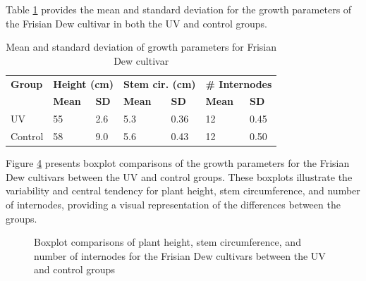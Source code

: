 Table \ref{tab:descriptive_statistics} provides the mean and standard deviation for the growth parameters of the Frisian Dew cultivar in both the UV and control groups.

\begin{table}[H]
    \caption[Mean and standard deviation of growth parameters]{Mean and standard deviation of growth parameters for Frisian Dew cultivar}
    \label{tab:descriptive_statistics}
    \begin{tabularx}{\linewidth}{l|XX|XX|XX}
        \toprule
        \textbf{Group} & \multicolumn{2}{l|}{\textbf{Height (\unit[mode=text]{\cm})}} & \multicolumn{2}{l|}{\textbf{Stem cir. (\unit[mode=text]{\cm})}} & \multicolumn{2}{l}{\textbf{\# Internodes}} \\
        & \textbf{Mean} & \textbf{SD} & \textbf{Mean} & \textbf{SD} & \textbf{Mean} & \textbf{SD} \\
        \midrule
        UV & \num[mode=text]{55} & \num[mode=text]{2.6} & \num[mode=text]{5.3} & \num[mode=text]{0.36} & \num[mode=text]{12} & \num[mode=text]{0.45} \\
        Control & \num[mode=text]{58} & \num[mode=text]{9.0} & \num[mode=text]{5.6} & \num[mode=text]{0.43} & \num[mode=text]{12} & \num[mode=text]{0.50} \\
        \bottomrule
    \end{tabularx}
\end{table}

Figure \ref{fig:boxplot_comparisons_growth_parameters} presents boxplot comparisons of the growth parameters for the Frisian Dew cultivars between the UV and control groups. These boxplots illustrate the variability and central tendency for plant height, stem circumference, and number of internodes, providing a visual representation of the differences between the groups.

\begin{figure}[H]
    \begin{subfigure}[t]{.32\textwidth}
        
        \label{fig:boxplot_comparison_height}
    \end{subfigure}
    \begin{subfigure}[t]{.32\textwidth}
        
        \label{fig:boxplot_comparison_stem-circumference}
    \end{subfigure}
    \begin{subfigure}[t]{.32\textwidth}
        
        \label{fig:boxplot_comparison_no-internodes}
    \end{subfigure}
    \caption[Comparison of growth parameters for Frisian Dew cultivars]{Boxplot comparisons of plant height, stem circumference, and number of internodes for the Frisian Dew cultivars between the UV and control groups}
    \label{fig:boxplot_comparisons_growth_parameters}
\end{figure}

